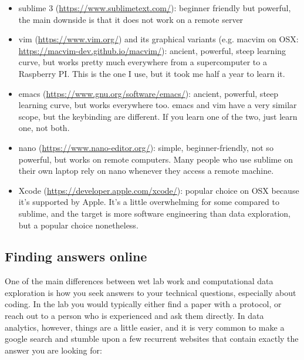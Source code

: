 \documentclass[12pt,a4paper,notitlepage,onecolumn]{article}
\begin{document}
\begin{itemize}
\item sublime 3 (\url{https://www.sublimetext.com/}): beginner friendly but powerful, the main downside is that it does not work on a remote server
\item vim (\url{https://www.vim.org/}) and its graphical variants (e.g. macvim on OSX: \url{https://macvim-dev.github.io/macvim/}): ancient, powerful, steep learning curve, but works pretty much everywhere from a supercomputer to a Raspberry PI. This is the one I use, but it took me half a year to learn it.
\item emacs (\url{https://www.gnu.org/software/emacs/}): ancient, powerful, steep learning curve, but works everywhere too. emacs and vim have a very similar scope, but the keybinding are different. If you learn one of the two, just learn one, not both.
\item nano (\url{https://www.nano-editor.org/}): simple, beginner-friendly, not so powerful, but works on remote computers. Many people who use sublime on their own laptop rely on nano whenever they access a remote machine.
\item Xcode (\url{https://developer.apple.com/xcode/}): popular choice on OSX because it's supported by Apple. It's a little overwhelming for some compared to sublime, and the target is more software engineering than data exploration, but a popular choice nonetheless.
\end{itemize}

\subsection{Finding answers online}
One of the main differences between wet lab work and computational data exploration is how you seek answers to your technical questions, especially about coding. In the lab you would typically either find a paper with a protocol, or reach out to a person who is experienced and ask them directly. In data analytics, however, things are a little easier, and it is very common to make a google search and stumble upon a few recurrent websites that contain exactly the answer you are looking for:
\end{document}
